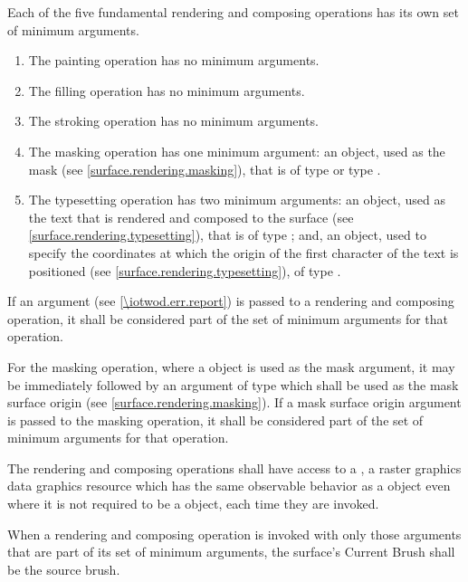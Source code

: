 \pnum
Each of the five fundamental rendering and composing operations has its own set of minimum arguments.
\begin{enumerate}
	\item The painting operation has no minimum arguments.
	\item The filling operation has no minimum arguments.
	\item The stroking operation has no minimum arguments.
	\item The masking operation has one minimum argument: an object, used as the mask (see \ref{surface.rendering.masking}), that is of type  or type .
	\item The typesetting operation has two minimum arguments: an object, used as the text that is rendered and composed to the surface (see \ref{surface.rendering.typesetting}), that is of type ; and, an object, used to specify the coordinates at which the origin of the first character of the text is positioned (see \ref{surface.rendering.typesetting}), of type .
\end{enumerate}

\pnum
If an  argument (see \ref{\iotwod.err.report}) is passed to a rendering and composing operation, it shall be considered part of the set of minimum arguments for that operation.

\pnum
For the masking operation, where a  object is used as the mask argument, it may be immediately followed by an argument of type  which shall be used as the mask surface origin (see \ref{surface.rendering.masking}). If a mask surface origin argument is passed to the masking operation, it shall be considered part of the set of minimum arguments for that operation.

\pnum
The rendering and composing operations shall have access to a , a raster graphics data graphics resource which has the same observable behavior as a  object even where it is not required to be a  object, each time they are invoked.

\pnum
When a rendering and composing operation is invoked with only those arguments that are part of its set of minimum arguments, the surface's Current Brush shall be the source brush.

